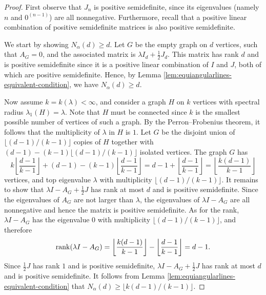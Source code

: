 \begin{proof}
    First observe that $J_n$ is positive semidefinite, since its eigenvalues (namely $n$ and $0^{(n - 1)}$) are all nonnegative.
    Furthermore, recall that a positive linear combination of positive semidefinite matrices is also positive semidefinite.
    
    We start by showing $N_\alpha(d) \ge d$.
    Let $G$ be the empty graph on $d$ vertices, such that $A_G = 0$, and the associated matrix is $\lambda I_d + \frac{1}{2}J_d$.
    This matrix has rank $d$ and is positive semidefinite since it is a positive linear combination of $I$ and $J$, both of which are positive semidefinite.
    Hence, by Lemma \ref{lem:equiangularlines-equivalent-condition}, we have $N_\alpha(d) \ge d$.

    Now assume $k = k(\lambda) < \infty$, and consider a graph $H$ on $k$ vertices with spectral radius $\lambda_1(H) = \lambda$.
    Note that $H$ must be connected since $k$ is the smallest possible number of vertices of such a graph. 
    By the Perron--Frobenius theorem, it follows that the multiplicity of $\lambda$ in $H$ is $1$.
    Let $G$ be the disjoint union of $\lfloor (d - 1) / (k - 1) \rfloor$ copies of $H$ together with $(d - 1) - (k - 1) \lfloor (d - 1) / (k - 1) \rfloor$ isolated vertices.
    The graph $G$ has 
    \begin{equation*}
        k \left \lfloor \frac{d - 1}{k - 1} \right \rfloor + (d - 1) - (k - 1) \left \lfloor \frac{d - 1}{k - 1} \right \rfloor 
            = d - 1 + \left \lfloor \frac{d - 1}{k - 1} \right \rfloor 
            = \left \lfloor \frac{k (d- 1)}{k - 1} \right \rfloor
    \end{equation*}
    vertices, and top eigenvalue $\lambda$ with multiplicity $\lfloor (d - 1) / (k - 1) \rfloor$.
    It remains to show that $\lambda I - A_G + \frac{1}{2} J$ has rank at most $d$ and is positive semidefinite.
    Since the eigenvalues of $A_G$ are not larger than $\lambda$, the eigenvalues of $\lambda I - A_G$ are all nonnegative and hence the matrix is positive semidefinite.
    As for the rank, $\lambda I - A_G$ has the eigenvalue $0$ with multiplicity $\lfloor (d - 1) / (k - 1) \rfloor$, and therefore 
    \begin{equation*}
        \operatorname{rank} (\lambda I - A_G) = \left \lfloor \frac{k (d- 1)}{k - 1} \right \rfloor - \left \lfloor \frac {d - 1}{k - 1} \right \rfloor = d - 1.
    \end{equation*}
    Since $\frac{1}{2} J$ has rank $1$ and is positive semidefinite, $\lambda I - A_G + \frac{1}{2} J$ has rank at most $d$ and is positive semidefinite.
    It follows from Lemma \ref{lem:equiangularlines-equivalent-condition} that $N_\alpha(d) \ge \lfloor k (d- 1) / (k - 1) \rfloor$.
\end{proof}

